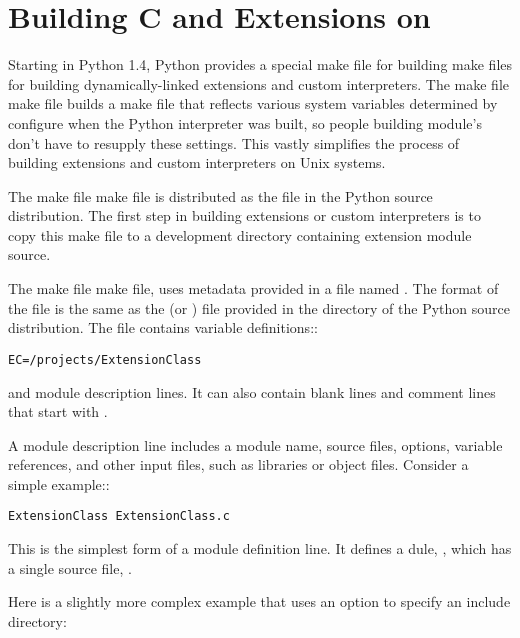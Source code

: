 \documentclass{manual}
\begin{document}
\chapter{Building C and \Cpp{} Extensions on \UNIX{}
         \label{building-extensions}}





Starting in Python 1.4, Python provides a special make file for
building make files for building dynamically-linked extensions and
custom interpreters.  The make file make file builds a make file
that reflects various system variables determined by configure when
the Python interpreter was built, so people building module's don't
have to resupply these settings.  This vastly simplifies the process
of building extensions and custom interpreters on Unix systems.

The make file make file is distributed as the file
 in the Python source distribution.  The
first step in building extensions or custom interpreters is to copy
this make file to a development directory containing extension module
source.

The make file make file,  uses metadata
provided in a file named .  The format of the 
file is the same as the  (or ) file
provided in the  directory of the Python source
distribution.  The  file contains variable definitions::

\begin{verbatim}
EC=/projects/ExtensionClass
\end{verbatim}

and module description lines.  It can also contain blank lines and
comment lines that start with \character{\#}.

A module description line includes a module name, source files,
options, variable references, and other input files, such
as libraries or object files.  Consider a simple example::

\begin{verbatim}
ExtensionClass ExtensionClass.c
\end{verbatim}

This is the simplest form of a module definition line.  It defines a
dule, , which has a single source file,
.

Here is a slightly more complex example that uses an 
option to specify an include directory:
\end{document}
